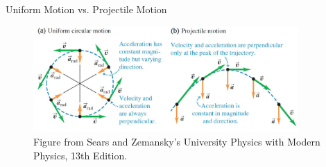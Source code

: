 \documentclass[]{beamer}
\begin{document}





\begin{frame}

    Uniform Motion vs. Projectile Motion

            
   
          
         \begin{figure}[h!]  
            \includegraphics[width=0.9\textwidth]{images/29.jpg}
            \caption{ {\tiny Figure from Sears and Zemansky's University Physics 
            with Modern Physics, 13th Edition.} }
          \end{figure}
          
     
       \end{frame}


\end{document}
